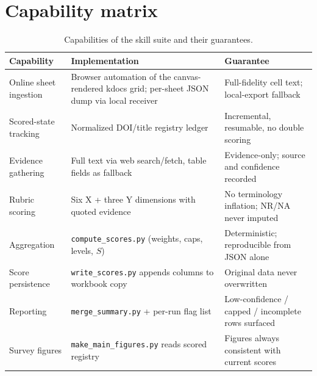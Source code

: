 \documentclass[11pt,a4paper]{article}
\begin{document}
\section{Capability matrix}
\begin{table}[htbp]
\centering\small
\caption{Capabilities of the skill suite and their guarantees.}
\begin{tabular}{@{}L{3.6cm}L{5.6cm}L{5.2cm}@{}}
\toprule
Capability & Implementation & Guarantee \\
\midrule
Online sheet ingestion & Browser automation of the canvas-rendered kdocs grid; per-sheet JSON dump via local receiver & Full-fidelity cell text; local-export fallback \\
Scored-state tracking & Normalized DOI/title registry ledger & Incremental, resumable, no double scoring \\
Evidence gathering & Full text via web search/fetch, table fields as fallback & Evidence-only; source and confidence recorded \\
Rubric scoring & Six X + three Y dimensions with quoted evidence & No terminology inflation; NR/NA never imputed \\
Aggregation & \texttt{compute\_scores.py} (weights, caps, levels, $S$) & Deterministic; reproducible from JSON alone \\
Score persistence & \texttt{write\_scores.py} appends columns to workbook copy & Original data never overwritten \\
Reporting & \texttt{merge\_summary.py} + per-run flag list & Low-confidence / capped / incomplete rows surfaced \\
Survey figures & \texttt{make\_main\_figures.py} reads scored registry & Figures always consistent with current scores \\
\bottomrule
\end{tabular}
\end{table}

\end{document}
